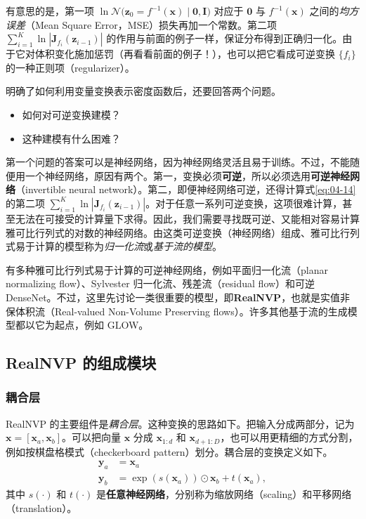 有意思的是，第一项 $\ln\mathcal{N}\bigl(\mathbf{z}_0=f^{-1}(\mathbf{x})\mid\mathbf{0},\mathbf{I}\bigr)$ 对应于 $\mathbf{0}$ 与 $f^{-1}(\mathbf{x})$ 之间的\emph{均方误差}（Mean Square Error，MSE）损失再加一个常数。第二项 $\sum_{i=1}^K\ln\left|\mathbf{J}_{f_i}(\mathbf{z}_{i-1})\right|$ 的作用与前面的例子一样，保证分布得到正确归一化。由于它对体积变化施加惩罚（再看看前面的例子！），也可以把它看成可逆变换 $\{f_i\}$ 的一种正则项（regularizer）。

明确了如何利用变量变换表示密度函数后，还要回答两个问题。
\begin{itemize}
\item 如何对可逆变换建模？
\item 这种建模有什么困难？
\end{itemize}
第一个问题的答案可以是神经网络，因为神经网络灵活且易于训练。不过，不能随便用一个神经网络，原因有两个。第一，变换必须\textbf{可逆}，所以必须选用\textbf{可逆神经网络}（invertible neural network）。第二，即便神经网络可逆，还得计算式\eqref{eq:04-14}的第二项 $\sum_{i=1}^K\ln\left|\mathbf{J}_{f_i}(\mathbf{z}_{i-1})\right|$。对于任意一系列可逆变换，这项很难计算，甚至无法在可接受的计算量下求得。因此，我们需要寻找既可逆、又能相对容易计算雅可比行列式的对数的神经网络。由这类可逆变换（神经网络）组成、雅可比行列式易于计算的模型称为\emph{归一化流}或\emph{基于流的模型}。

有多种雅可比行列式易于计算的可逆神经网络，例如平面归一化流（planar normalizing flow）、Sylvester 归一化流、残差流（residual flow）和可逆 DenseNet。不过，这里先讨论一类很重要的模型，即\textbf{RealNVP}，也就是实值非保体积流（Real-valued Non-Volume Preserving flows）。许多其他基于流的生成模型都以它为起点，例如 GLOW。

\subsection{RealNVP 的组成模块}
\subsubsection{耦合层}

RealNVP 的主要组件是\emph{耦合层}。这种变换的思路如下。把输入分成两部分，记为 $\mathbf{x}=[\mathbf{x}_a,\mathbf{x}_b]$。可以把向量 $\mathbf{x}$ 分成 $\mathbf{x}_{1:d}$ 和 $\mathbf{x}_{d+1:D}$，也可以用更精细的方式分割，例如按棋盘格模式（checkerboard pattern）划分。耦合层的变换定义如下。
\begin{align}
\mathbf{y}_a&=\mathbf{x}_a
\tag{4.15}\label{eq:04-15}\\
\mathbf{y}_b&=\exp(s(\mathbf{x}_a))\odot\mathbf{x}_b+t(\mathbf{x}_a),
\tag{4.16}\label{eq:04-16}
\end{align}
其中 $s(\cdot)$ 和 $t(\cdot)$ 是\textbf{任意神经网络}，分别称为缩放网络（scaling）和平移网络（translation）。

